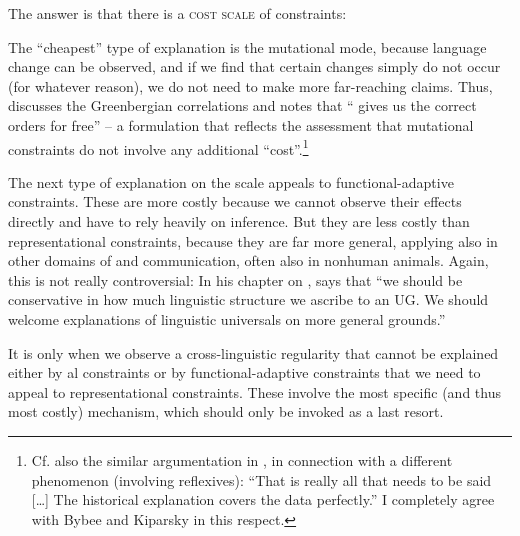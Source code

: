 \documentclass[output=paper]{langsci/langscibook}
\begin{document}
  The answer is that there is a \textsc{cost scale} of constraints:


The “cheapest” type of explanation is the mutational mode, because language change can be observed, and if we find that certain changes simply do not occur (for whatever reason), we do not need to make more far-reaching claims. Thus, \citet[111]{Bybee2010} discusses the Greenbergian  correlations and notes that “ gives us the correct orders for free” – a formulation that reflects the assessment that mutational constraints do not involve any additional “cost”.\footnote{Cf. also the similar argumentation in \citet[33]{Kiparsky2008}, in connection with a different phenomenon (involving reflexives): “That is really all that needs to be said […] The historical explanation covers the data perfectly.” I completely agree with Bybee and Kiparsky in this respect.}

The next type of explanation on the scale appeals to functional-adaptive constraints. These are more costly because we cannot observe their effects directly and have to rely heavily on inference. But they are less costly than representational constraints, because they are far more general, applying also in other domains of   and communication, often also in nonhuman animals. Again, this is not really controversial: In his chapter on , \citet[79]{Jackendoff2002} says that “we should be conservative in how much linguistic structure we ascribe to an  UG. We should welcome explanations of linguistic universals on more general  grounds.”

It is only when we observe a cross-linguistic regularity that cannot be explained either by al constraints or by functional-adaptive constraints that we need to appeal to representational constraints. These involve the most specific (and thus most costly) mechanism, which should only be invoked as a last resort.
\end{document}
